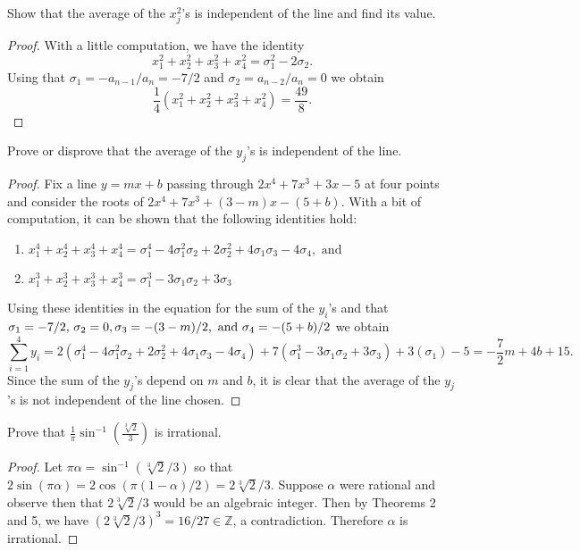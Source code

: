 \documentclass[10pt]{amsart}
\begin{document}
\begin{thm}
  Show that the average of the $x_j^2$'s is independent of the line and find its value.
  \begin{proof}
    With a little computation, we have the identity $$x_1^2 + x_2^2 + x_3^2 + x_4^2 = \sigma_1^2 - 2\sigma_2.$$
    Using that $\sigma_1 = -a_{n-1}/a_n = -7/2$ and $\sigma_2 = a_{n-2}/a_n = 0$ we obtain $$\frac{1}{4}(x_1^2 + x_2^2 + x_3^2 + x_4^2) = \frac{49}{8}.$$
  \end{proof}
\end{thm}

\begin{thm}
  Prove or disprove that the average of the $y_j$'s is independent of the line.
  \begin{proof}
    Fix a line $y = mx + b$ passing through $2x^4 + 7x^3 + 3x -5$ at four points and consider the roots of $2x^4 + 7x^3 + (3-m)x - (5+b)$.
    With a bit of computation, it can be shown that the following identities hold:
    \begin{enumerate}
    \item
      $x_1^4 + x_2^4 + x_3^4 + x_4^4 = \sigma_{1}^{4} - 4 \sigma_{1}^{2} \sigma_{2} + 2 \sigma_{2}^{2} + 4
      \sigma_{1} \sigma_{3} - 4 \sigma_{4}, \text{ and }$
    \item
      $x_1^3 + x_2^3 + x_3^3 + x_4^3 = \sigma_{1}^{3} - 3 \sigma_{1} \sigma_{2} + 3 \sigma_{3}$
    \end{enumerate}
    Using these identities in the equation for the sum of the $y_i$'s and that $\sigma_1 = -7/2,\, \sigma_2 = 0,\\ \sigma_3 = -(3-m)/2, \text{ and } \sigma_4 = -(5 + b)/2$ we obtain
    $$\sum_{i=1}^4 y_i= 2(\sigma_{1}^{4} - 4 \sigma_{1}^{2} \sigma_{2} + 2 \sigma_{2}^{2} + 4
    \sigma_{1} \sigma_{3} - 4 \sigma_{4}) + 7(\sigma_{1}^{3} - 3 \sigma_{1} \sigma_{2} + 3 \sigma_{3}) + 3(\sigma_1) - 5 = -\frac{7}{2} m + 4 b + 15.$$
    Since the sum of the $y_j$'s depend on $m$ and $b$, it is clear that the average of the $y_j$'s is not independent of the line chosen.

  \end{proof}
\end{thm}

\begin{thm}
  Prove that $\displaystyle{\frac{1}{\pi}\sin^{-1}\left(\frac{\sqrt[3]{2}}{3}\right)}$ is irrational.
  \begin{proof}
    Let $\pi\alpha = \sin^{-1}(\sqrt[3]{2}/3)$ so that $2\sin(\pi\alpha) = 2\cos(\pi(1-\alpha)/2) = 2\sqrt[3]{2}/3$.
    Suppose $\alpha$ were rational and observe then that $2\sqrt[3]{2}/3$ would be an algebraic integer.
    Then by Theorems 2 and 5, we have $(2\sqrt[3]{2}/3)^3 = 16/27 \in \mathbb{Z}$, a contradiction.
    Therefore $\alpha$ is irrational.
    
  \end{proof}
\end{thm}
\end{document}
